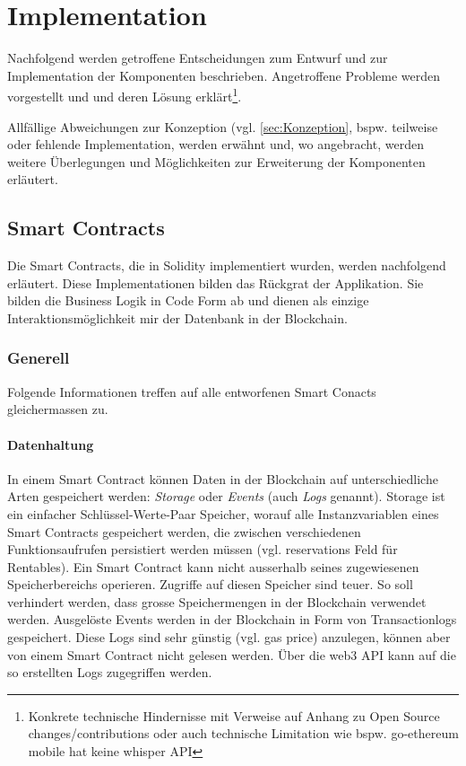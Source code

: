 \section{Implementation}
\label{sec:Implementation}
Nachfolgend werden getroffene Entscheidungen zum Entwurf und zur Implementation der Komponenten beschrieben. Angetroffene Probleme werden vorgestellt und und deren Lösung erklärt\footnote{Konkrete technische Hindernisse mit Verweise auf Anhang zu Open Source changes/contributions oder auch technische Limitation wie bspw. go-ethereum mobile hat keine whisper API}.

Allfällige Abweichungen zur Konzeption (vgl. \ref{sec:Konzeption}, bspw. teilweise oder fehlende Implementation, werden erwähnt und, wo angebracht, werden weitere Überlegungen und Möglichkeiten zur Erweiterung der Komponenten erläutert.

\subsection{Smart Contracts}
\label{subsec:Smart_Contracts}
Die Smart Contracts, die in Solidity implementiert wurden, werden nachfolgend erläutert. Diese Implementationen bilden das Rückgrat der Applikation. Sie bilden die Business Logik in Code Form ab und dienen als einzige Interaktionsmöglichkeit mir der Datenbank in der Blockchain.\cite[Introduction to Smart Contracts]{solidity.readthedocs.io}

\subsubsection{Generell}
Folgende Informationen treffen auf alle entworfenen Smart Conacts gleichermassen zu.
\paragraph{Datenhaltung}
In einem Smart Contract können Daten in der Blockchain auf unterschiedliche Arten gespeichert werden: \emph{Storage} oder \emph{Events} (auch \emph{Logs} genannt). Storage ist ein einfacher Schlüssel-Werte-Paar Speicher, worauf alle Instanzvariablen eines Smart Contracts gespeichert werden, die zwischen verschiedenen Funktionsaufrufen persistiert werden müssen (vgl. reservations Feld für Rentables). Ein Smart Contract kann nicht ausserhalb seines zugewiesenen Speicherbereichs operieren. Zugriffe auf diesen Speicher sind teuer. So soll verhindert werden, dass grosse Speichermengen in der Blockchain verwendet werden. Ausgelöste Events werden in der Blockchain in Form von Transactionlogs gespeichert. Diese Logs sind sehr günstig (vgl. gas price) anzulegen, können aber von einem Smart Contract nicht gelesen werden. Über die web3 API kann auf die so erstellten Logs zugegriffen werden.\cite[Miscellaneous, Introduction to Smart Contracts]{solidity.readthedocs.io}\cite{jonathanpatrick.me/ethereum}

